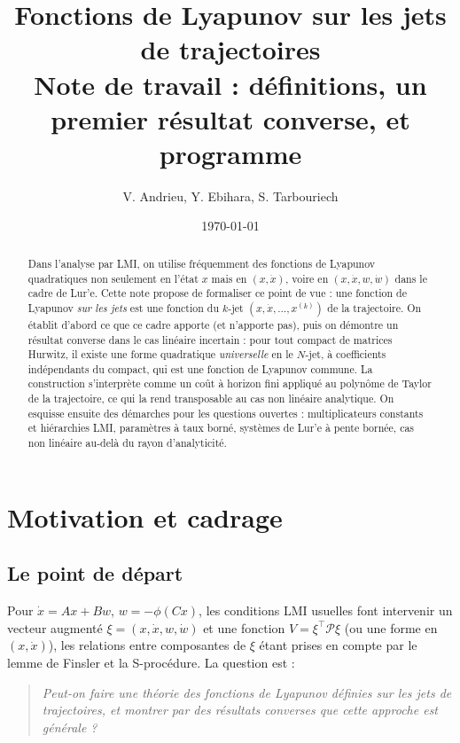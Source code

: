 \documentclass[11pt,a4paper]{article}
\title{Fonctions de Lyapunov sur les jets de trajectoires\\[2mm]
\large Note de travail : définitions, un premier résultat converse, et programme}
\author{V. Andrieu, Y. Ebihara, S. Tarbouriech}
\date{\today}
\theoremstyle{definition}
\theoremstyle{remark}
\newcommand{\tr}{^{\top}}
\begin{document}
\maketitle
\begin{center}\end{center}
\medskip

\begin{abstract}
Dans l'analyse par LMI, on utilise fréquemment des fonctions de Lyapunov quadratiques non seulement en l'état $x$ mais en $(x,\dot x)$, voire en $(x,\dot x, w, \dot w)$ dans le cadre de Lur'e. Cette note propose de formaliser ce point de vue : une fonction de Lyapunov \emph{sur les jets} est une fonction du $k$-jet $(x,\dot x,\dots,x^{(k)})$ de la trajectoire. On établit d'abord ce que ce cadre apporte (et n'apporte pas), puis on démontre un résultat converse dans le cas linéaire incertain : pour tout compact de matrices Hurwitz, il existe une forme quadratique \emph{universelle} en le $N$-jet, à coefficients indépendants du compact, qui est une fonction de Lyapunov commune. La construction s'interprète comme un coût à horizon fini appliqué au polynôme de Taylor de la trajectoire, ce qui la rend transposable au cas non linéaire analytique. On esquisse ensuite des démarches pour les questions ouvertes : multiplicateurs constants et hiérarchies LMI, paramètres à taux borné, systèmes de Lur'e à pente bornée, cas non linéaire au-delà du rayon d'analyticité.
\end{abstract}

\tableofcontents

\section{Motivation et cadrage}

\subsection{Le point de départ}
Pour $\dot x = Ax + Bw$, $w=-\phi(Cx)$, les conditions LMI usuelles font intervenir un vecteur augmenté $\xi = (x,\dot x, w, \dot w)$ et une fonction $V = \xi\tr \mathcal P \xi$ (ou une forme en $(x,\dot x)$), les relations entre composantes de $\xi$ étant prises en compte par le lemme de Finsler et la S-procédure. La question est :
\begin{quote}
\emph{Peut-on faire une théorie des fonctions de Lyapunov définies sur les jets de trajectoires, et montrer par des résultats converses que cette approche est générale ?}
\end{quote}
\end{document}

